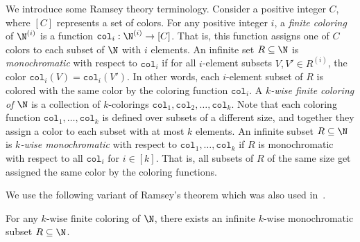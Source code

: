 \documentclass{toc}
\begin{document}
We introduce some Ramsey theory terminology.
Consider a positive integer $C$, where $[C]$ represents a set of colors.
For any positive integer $i$, a \emph{finite coloring} of $\N^{(i)}$ is a function $\texttt{col}_i:\N^{(i)} \to [C]$. That is, this function assigns one of $C$ colors to each subset of $\N$ with $i$ elements. 
An infinite set $R \subseteq \N$ is \emph{monochromatic} with respect to $\texttt{col}_i$ if for all $i$-element subsets $V, V' \in R^{(i)}$, the color $\texttt{col}_i(V) = \texttt{col}_i(V')$. In other words, each $i$-element subset of $R$ is colored with the same color by the coloring function $\texttt{col}_i$.
 A \emph{$k$-wise finite coloring of $\N$} is a collection of $k$-colorings $\texttt{col}_1, \texttt{col}_2, \ldots, \texttt{col}_k$.
Note that each coloring function $\texttt{col}_1, \ldots, \texttt{col}_k$ is defined over subsets of a different size, and together they assign a color to each subset with at most $k$ elements.
An infinite subset $R \subseteq \N$ is \emph{$k$-wise monochromatic}
with respect to $\texttt{col}_1, \ldots, \texttt{col}_k$ if $R$ is monochromatic with respect to all $\texttt{col}_i$ for $i \in [k]$. That is, all subsets of $R$ of the same size get assigned the same color by the coloring functions.

We use the following variant of Ramsey's theorem which was also used in~\cite{Fis04,CS14}.

\begin{theorem}\label{thm:ramsey}
For any $k$-wise finite coloring of $\N$, there exists an infinite $k$-wise monochromatic subset $R \subseteq \N$.
\end{theorem}
\end{document}

